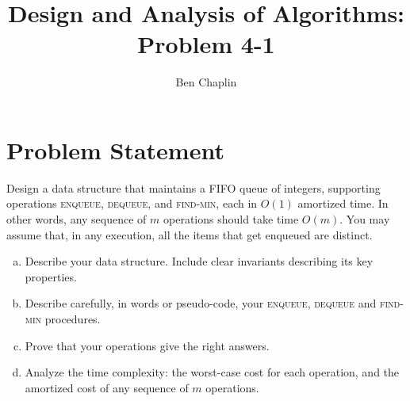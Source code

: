 \documentclass[11pt]{article}
\title{Design and Analysis of Algorithms: Problem 4-1}
\author{Ben Chaplin}
\date{}
\theoremstyle{plain}
\theoremstyle{definition}
\begin{document}
\maketitle
\tableofcontents

\section{Problem Statement}

Design a data structure that maintains a FIFO queue of integers, supporting operations \textsc{enqueue},
\textsc{dequeue}, and \textsc{find-min}, each in $O(1)$ amortized time. In other words, any sequence 
of $m$ operations should take time $O(m)$. You may assume that, in any execution, all the items that 
get enqueued are distinct.

\begin{enumerate}[a)]
    \item Describe your data structure. Include clear invariants describing its key properties. 
    \item Describe carefully, in words or pseudo-code, your \textsc{enqueue}, \textsc{dequeue} and 
        \textsc{find-min} procedures.
    \item Prove that your operations give the right answers.
    \item Analyze the time complexity: the worst-case cost for each operation, and the amortized cost 
        of any sequence of $m$ operations.
\end{enumerate}
\end{document}
